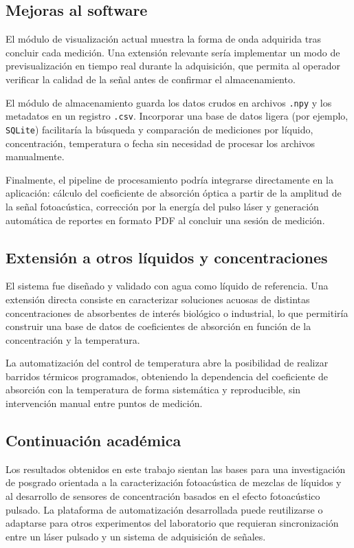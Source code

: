 \subsection*{Mejoras al software}

El módulo de visualización actual muestra la forma de onda adquirida
tras concluir cada medición. Una extensión relevante sería implementar
un modo de previsualización en tiempo real durante la adquisición,
que permita al operador verificar la calidad de la señal antes de
confirmar el almacenamiento.

El módulo de almacenamiento guarda los datos crudos en archivos
\texttt{.npy} y los metadatos en un registro \texttt{.csv}.
Incorporar una base de datos ligera (por ejemplo, \texttt{SQLite})
facilitaría la búsqueda y comparación de mediciones por líquido,
concentración, temperatura o fecha sin necesidad de procesar los
archivos manualmente.

Finalmente, el pipeline de procesamiento podría integrarse
directamente en la aplicación: cálculo del coeficiente de absorción
óptica a partir de la amplitud de la señal fotoacústica, corrección
por la energía del pulso láser y generación automática de reportes
en formato PDF al concluir una sesión de medición.

\subsection*{Extensión a otros líquidos y concentraciones}

El sistema fue diseñado y validado con agua como líquido de
referencia. Una extensión directa consiste en caracterizar
soluciones acuosas de distintas concentraciones de absorbentes
de interés biológico o industrial, lo que permitiría construir
una base de datos de coeficientes de absorción en función de la
concentración y la temperatura.

La automatización del control de temperatura abre la posibilidad
de realizar barridos térmicos programados, obteniendo la dependencia
del coeficiente de absorción con la temperatura de forma sistemática
y reproducible, sin intervención manual entre puntos de medición.

\subsection*{Continuación académica}

Los resultados obtenidos en este trabajo sientan las bases para
una investigación de posgrado orientada a la caracterización
fotoacústica de mezclas de líquidos y al desarrollo de sensores
de concentración basados en el efecto fotoacústico pulsado.
La plataforma de automatización desarrollada puede reutilizarse
o adaptarse para otros experimentos del laboratorio que requieran
sincronización entre un láser pulsado y un sistema de adquisición
de señales.
